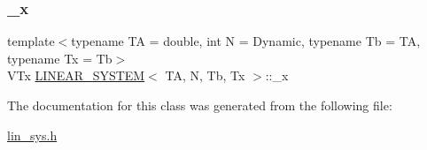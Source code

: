 \mbox{\label{class_l_i_n_e_a_r___s_y_s_t_e_m_abc1a6ac63a5c66a14e47cdb22559fefa}} 
\subsubsection{\texorpdfstring{\+\_\+x}{\_x}}
{\footnotesize\ttfamily template$<$typename TA = double, int N = Dynamic, typename Tb = TA, typename Tx = Tb$>$ \\
V\+Tx \mbox{\hyperlink{class_l_i_n_e_a_r___s_y_s_t_e_m}{L\+I\+N\+E\+A\+R\+\_\+\+S\+Y\+S\+T\+EM}}$<$ TA, N, Tb, Tx $>$\+::\+\_\+x\hspace{0.3cm}{\ttfamily [protected]}}



The documentation for this class was generated from the following file\+:\begin{DoxyCompactItemize}
\item 
\mbox{\hyperlink{lin__sys_8h}{lin\+\_\+sys.\+h}}\end{DoxyCompactItemize}
